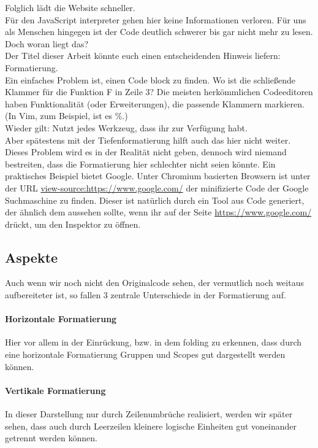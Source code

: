 		Folglich lädt die Website schneller.\\
		Für den JavaScript interpreter gehen hier keine Informationen verloren.
		Für uns als Menschen hingegen ist der Code deutlich schwerer bis gar nicht mehr zu lesen.\\
		Doch woran liegt das?\\
		Der Titel dieser Arbeit könnte euch einen entscheidenden Hinweis liefern: Formatierung.\\
		Ein einfaches Problem ist, einen Code block zu finden.
		Wo ist die schließende Klammer für die Funktion F in Zeile 3?
		Die meisten herkömmlichen Codeeditoren haben Funktionalität (oder Erweiterungen), die passende Klammern markieren. (In Vim, zum Beispiel, ist es \%.)\\
		Wieder gilt: Nutzt jedes Werkzeug, dass ihr zur Verfügung habt.\\
		Aber spätestens mit der Tiefenformatierung hilft auch das hier nicht weiter.\\
		Dieses Problem wird es in der Realität nicht geben, dennoch wird niemand bestreiten, dass die Formatierung hier schlechter nicht seien könnte.
		Ein praktisches Beispiel bietet Google. Unter Chromium basierten Browsern ist unter der URL \href{view-source:https://www.google.com/}{view-source:https://www.google.com/} der minifizierte Code der Google Suchmaschine zu finden.
		Dieser ist natürlich durch ein Tool aus  Code generiert, der ähnlich dem aussehen sollte, wenn ihr auf der Seite \href{https://www.google.com/}{https://www.google.com/}  drückt, um den Inspektor zu öffnen.

	\subsection{Aspekte}
		Auch wenn wir noch nicht den Originalcode sehen, der vermutlich noch weitaus aufbereiteter ist, so fallen 3 zentrale Unterschiede in der Formatierung auf.
		\paragraph{Horizontale Formatierung}
			Hier vor allem in der Einrückung, bzw. in dem folding zu erkennen, dass durch eine horizontale Formatierung Gruppen und Scopes gut dargestellt werden können.
		\paragraph{Vertikale Formatierung}
			In dieser Darstellung nur durch Zeilenumbrüche realisiert, werden wir später sehen, dass auch durch Leerzeilen kleinere logische Einheiten gut voneinander getrennt werden können.
